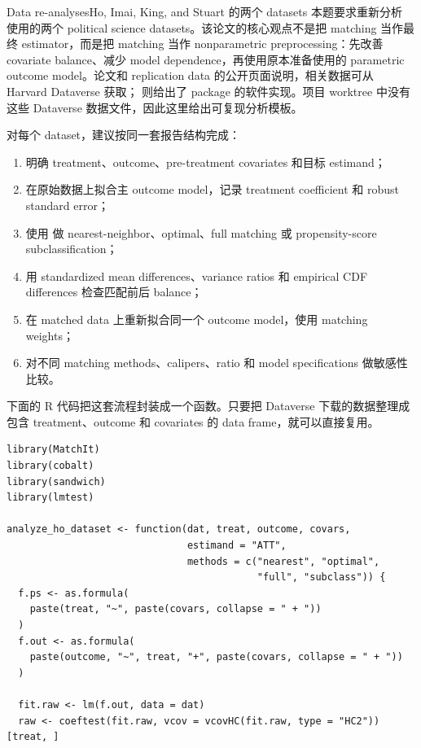\begin{exercisesolution}{Data re-analyses}{Ho, Imai, King, and Stuart 的两个 datasets}
本题要求重新分析 \citet{ho2007matching} 使用的两个 political science datasets。该论文的核心观点不是把 matching 当作最终 estimator，而是把 matching 当作 nonparametric preprocessing：先改善 covariate balance、减少 model dependence，再使用原本准备使用的 parametric outcome model。论文和 replication data 的公开页面说明，相关数据可从 Harvard Dataverse 获取；\citet{ho2011matchit} 则给出了  package 的软件实现。项目 worktree 中没有这些 Dataverse 数据文件，因此这里给出可复现分析模板。

对每个 dataset，建议按同一套报告结构完成：
\begin{enumerate}
\item 明确 treatment、outcome、pre-treatment covariates 和目标 estimand；
\item 在原始数据上拟合主 outcome model，记录 treatment coefficient 和 robust standard error；
\item 使用  做 nearest-neighbor、optimal、full matching 或 propensity-score subclassification；
\item 用 standardized mean differences、variance ratios 和 empirical CDF differences 检查匹配前后 balance；
\item 在 matched data 上重新拟合同一个 outcome model，使用 matching weights；
\item 对不同 matching methods、calipers、ratio 和 model specifications 做敏感性比较。
\end{enumerate}

下面的 R 代码把这套流程封装成一个函数。只要把 Dataverse 下载的数据整理成包含 treatment、outcome 和 covariates 的 data frame，就可以直接复用。

\begin{lstlisting}
library(MatchIt)
library(cobalt)
library(sandwich)
library(lmtest)

analyze_ho_dataset <- function(dat, treat, outcome, covars,
                               estimand = "ATT",
                               methods = c("nearest", "optimal",
                                           "full", "subclass")) {
  f.ps <- as.formula(
    paste(treat, "~", paste(covars, collapse = " + "))
  )
  f.out <- as.formula(
    paste(outcome, "~", treat, "+", paste(covars, collapse = " + "))
  )

  fit.raw <- lm(f.out, data = dat)
  raw <- coeftest(fit.raw, vcov = vcovHC(fit.raw, type = "HC2"))[treat, ]


\end{lstlisting}
\end{exercisesolution}
